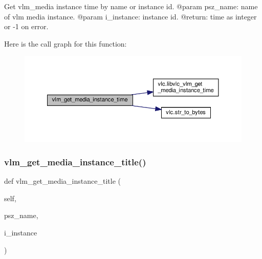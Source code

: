 \begin{DoxyVerb}Get vlm_media instance time by name or instance id.
@param psz_name: name of vlm media instance.
@param i_instance: instance id.
@return: time as integer or -1 on error.
\end{DoxyVerb}
 Here is the call graph for this function\+:
\nopagebreak
\begin{figure}[H]
\begin{center}
\leavevmode
\includegraphics[width=350pt]{classvlc_1_1_instance_ad91c405b7c321f63205ae6bd3d1a2591_cgraph}
\end{center}
\end{figure}
\mbox{\label{classvlc_1_1_instance_ada993533f9c1e0ac7b29e902ed26573a}} 
\subsubsection{\texorpdfstring{vlm\+\_\+get\+\_\+media\+\_\+instance\+\_\+title()}{vlm\_get\_media\_instance\_title()}}
{\footnotesize\ttfamily def vlm\+\_\+get\+\_\+media\+\_\+instance\+\_\+title (\begin{DoxyParamCaption}\item[{}]{self,  }\item[{}]{psz\+\_\+name,  }\item[{}]{i\+\_\+instance }\end{DoxyParamCaption})}

